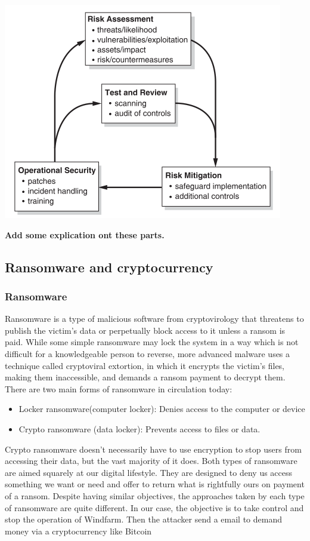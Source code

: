 \documentclass[twosided,a4,10pt]{article}
\begin{document}
\begin{multicols}{2}
\includegraphics[scale=0.65]{security_management}

\textbf{Add some explication ont these parts.} 
 
 
\subsection{Ransomware and cryptocurrency}
\subsubsection{Ransomware}
Ransomware is a type of malicious software from cryptovirology that threatens to publish the victim's data or perpetually block access to it unless a ransom is paid. While some simple ransomware may lock the system in a way which is not difficult for a knowledgeable person to reverse, more advanced malware uses a technique called cryptoviral extortion, in which it encrypts the victim's files, making them inaccessible, and demands a ransom payment to decrypt them.\newline
There are two main forms of ransomware in circulation today:
\begin{itemize}
    \item Locker ransomware(computer locker):
Denies access to the
computer or device
\item Crypto ransomware
(data locker): Prevents
access to files or data.
\end{itemize}
Crypto ransomware doesn’t necessarily have to use encryption to stop users from accessing their data, but the vast majority of it does. Both types of ransomware are aimed squarely at our digital lifestyle. They are designed to deny us access something we want or need and offer to return what is rightfully ours on payment of a ransom. Despite having similar objectives, the approaches taken by each type of ransomware are quite different.
In our case, the objective is to take control and stop the operation of Windfarm. Then the attacker send a email to demand money via a cryptocurrency like Bitcoin



\end{multicols}
\end{document}

